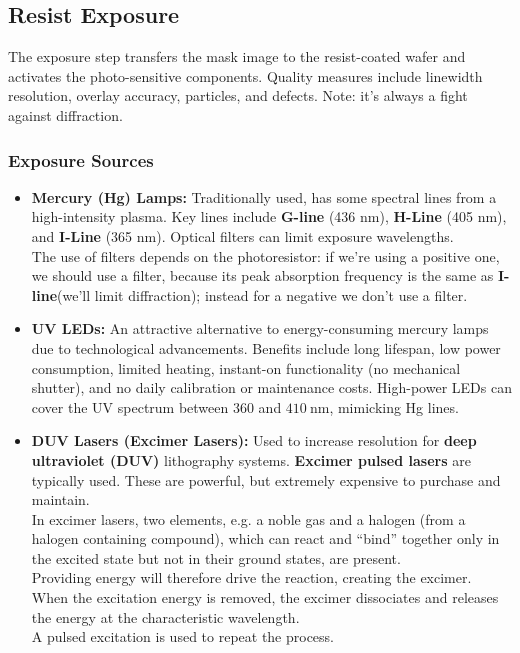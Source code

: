 \documentclass{report}
\begin{document}
\subsection{Resist Exposure}
The exposure step transfers the mask image to the resist-coated wafer and activates the photo-sensitive components. Quality measures include linewidth resolution, overlay accuracy, particles, and defects. Note: it's always a fight against diffraction.
\subsubsection{Exposure Sources} 
\begin{itemize} 
    \item \textbf{Mercury (Hg) Lamps:} Traditionally used, has some spectral lines from a high-intensity plasma. Key lines include \textbf{G-line} (436 nm), \textbf{H-Line} (405 nm), and \textbf{I-Line} (365 nm). Optical filters can limit exposure wavelengths.
    \\The use of filters depends on the photoresistor: if we're using a positive one, we should use a filter, because its peak absorption frequency is the same as \textbf{I-line}(we'll limit diffraction); instead for a negative we don't use a filter.
    \item \textbf{UV LEDs:} An attractive alternative to energy-consuming mercury lamps due to technological advancements. Benefits include long lifespan, low power consumption, limited heating, instant-on functionality (no mechanical shutter), and no daily calibration or maintenance costs. High-power LEDs can cover the UV spectrum between 360 and $410~\text{nm}$, mimicking Hg lines. 
    \item \textbf{DUV Lasers (Excimer Lasers):} Used to increase resolution for \textbf{deep ultraviolet (DUV) }lithography systems. \textbf{Excimer pulsed lasers} are typically used. These are powerful, but extremely expensive to purchase and maintain.
    \\In excimer lasers, two elements, e.g. a noble gas and a halogen (from a halogen containing compound), which can react and “bind” together only in the excited state but not in their ground states, are present.\\Providing energy will therefore drive the reaction, creating the excimer. \\When the excitation energy is removed, the excimer dissociates and releases the energy at the characteristic wavelength. \\A pulsed excitation is used to repeat the process.

\end{itemize}
\end{document}
